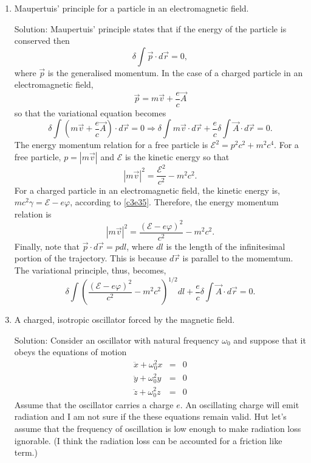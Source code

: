 \begin{enumerate}
\item Maupertuis' principle for a particle in an electromagnetic field.
\item[Solution:] Maupertuis' principle states that if the energy of the particle is
conserved then 
\[
\delta\int\vec{p}\cdot d\vec{r} = 0,
\]
where $\vec{p}$ is the generalised momentum. In the case of a charged particle in
an electromagnetic field,
\[
\vec{p} = m\vec{v} + \frac{e}{c}\vec{A}
\]
so that the variational equation becomes
\[
\delta\int\left(m\vec{v} + \frac{e}{c}\vec{A}\right)\cdot d\vec{r} = 0 \Rightarrow
\delta\int m\vec{v}\cdot d\vec{r} + \frac{e}{c}\delta\int\vec{A}\cdot d\vec{r} = 0.
\]
The energy momentum relation for a free particle is $\mathcal{E}^2 = p^2c^2 + 
m^2c^4$. For a free particle, $p = |m\vec{v}|$ and $\mathcal{E}$ is the kinetic
energy so that
\[
|m\vec{v}|^2 = \frac{\mathcal{E}^2}{c^2} - m^2c^2.
\]
For a charged particle in an electromagnetic field, the kinetic energy is, $mc^2
\gamma = \mathcal{E} - e\varphi$, according to \eqref{c3e35}. Therefore, the energy
momentum relation is
\[
|m\vec{v}|^2 = \frac{(\mathcal{E} - e\varphi)^2}{c^2} - m^2c^2.
\]
Finally, note that $\vec{p}\cdot d\vec{r} = pdl$, where $dl$ is the length of the
infinitesimal portion of the trajectory. This is because $d\vec{r}$ is parallel to
the momemtum. The variational principle, thus, becomes,
\[
\delta\int \left(\frac{(\mathcal{E} - e\varphi)^2}{c^2} - m^2c^2\right)^{1/2}dl + 
\frac{e}{c}\delta\int\vec{A}\cdot d\vec{r} = 0.
\]

\item A charged, isotropic oscillator forced by the magnetic field.
\item[Solution:] Consider an oscillator with natural frequency $\omega_0$ and 
suppose that it obeys the equations of motion
\begin{eqnarray*}
\ddot{x} + \omega_0^2 x &=& 0 \\
\ddot{y} + \omega_0^2 y &=& 0 \\
\ddot{z} + \omega_0^2 z &=& 0
\end{eqnarray*}
Assume that the oscillator carries a charge $e$. An oscillating charge will emit
radiation and I am not sure if the these equations remain valid. Hut let's assume
that the frequency of oscillation is low enough to make radiation loss ignorable.
(I think the radiation loss can be accounted for a friction like term.)


\end{enumerate}
